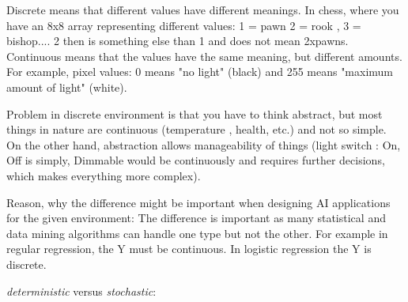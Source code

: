 \documentclass[10pt,a4paper]{article}
\begin{document}
		Discrete means that different values have different meanings. In chess, where you have an 8x8 array representing different values: 1 = pawn 2 = rook , 3 = bishop.... 2 then is something else than 1 and does not mean 2xpawns.
Continuous means that the values have the same meaning, but different amounts. For example, pixel values: 0 means "no light" (black) and 255 means "maximum amount of light" (white).

Problem in discrete environment is that you have to think abstract, but most things in nature are continuous (temperature , health, etc.) and not so simple. On the other hand, abstraction allows manageability of things (light switch : On, Off is simply, Dimmable would be continuously and requires further decisions, which makes everything more complex).

Reason, why the difference might be important when designing AI applications for the given environment:
The difference is important as many statistical and data mining algorithms can handle one type but not the other. For example in regular regression, the Y must be continuous. In logistic regression the Y is discrete.


		
		\noindent \textit{deterministic} versus \textit{stochastic}:
		\\ 
		
\end{document}

